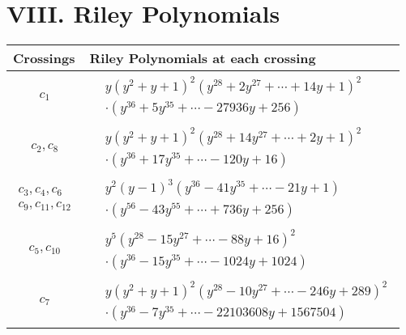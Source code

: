 \documentclass[1p]{elsarticle_modified}
\theoremstyle{definition}
\begin{document}
\centering \section*{ VIII. Riley Polynomials}
\begin{tabular}{m{50pt}|m{274pt}}
Crossings & \hspace{64pt}Riley Polynomials at each crossing \\
\hline $$\begin{aligned}c_{1}\end{aligned}$$&$\begin{aligned}
&y(y^2+y+1)^2(y^{28}+2 y^{27}+\cdots+14 y+1)^{2}\\
&\cdot(y^{36}+5 y^{35}+\cdots-27936 y+256)
\end{aligned}$\\
\hline $$\begin{aligned}c_{2},c_{8}\end{aligned}$$&$\begin{aligned}
&y(y^2+y+1)^2(y^{28}+14 y^{27}+\cdots+2 y+1)^{2}\\
&\cdot(y^{36}+17 y^{35}+\cdots-120 y+16)
\end{aligned}$\\
\hline $$\begin{aligned}c_{3},c_{4},c_{6}\\c_{9},c_{11},c_{12}\end{aligned}$$&$\begin{aligned}
&y^2(y-1)^3(y^{36}-41 y^{35}+\cdots-21 y+1)\\
&\cdot(y^{56}-43 y^{55}+\cdots+736 y+256)
\end{aligned}$\\
\hline $$\begin{aligned}c_{5},c_{10}\end{aligned}$$&$\begin{aligned}
&y^5(y^{28}-15 y^{27}+\cdots-88 y+16)^{2}\\
&\cdot(y^{36}-15 y^{35}+\cdots-1024 y+1024)
\end{aligned}$\\
\hline $$\begin{aligned}c_{7}\end{aligned}$$&$\begin{aligned}
&y(y^2+y+1)^2(y^{28}-10 y^{27}+\cdots-246 y+289)^{2}\\
&\cdot(y^{36}-7 y^{35}+\cdots-22103608 y+1567504)
\end{aligned}$\\
\hline
\end{tabular}
\vskip 2pc
\end{document}
